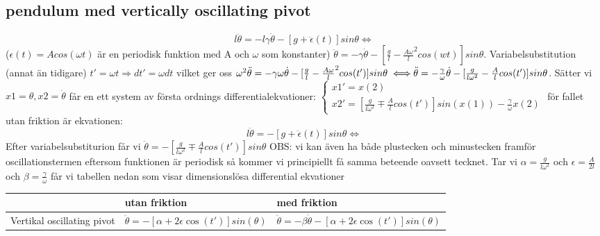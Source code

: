 \documentclass{article}
\begin{document}
\subsection{pendulum med vertically oscillating pivot}
\begin{equation}  
l\ddot{\theta} = -l{\gamma}\dot{\theta}-[g + \ddot{\epsilon}(t)] sin{\theta} \iff
\end{equation} ($ {\epsilon}(t)= Acos({\omega}t) $ är en periodisk funktion med A och ${\omega}$ som konstanter)
$ \ddot{\theta} = -{\gamma}\dot{\theta}-[\frac{g}{l} - \frac{A\omega}{l}^{2} cos(wt)] sin{\theta}$. Variabelsubstitution (annat än tidigare) $t' = {\omega}t \Rightarrow dt' = {\omega}dt$ vilket ger oss $ {\omega}^{2} \ddot{\theta} = -{\gamma}{\omega}\dot{\theta}-[\frac{g}{l} - \frac{A\omega}{l}^{2} cos(t')] sin{\theta} \iff \newline \ddot{\theta} = -\frac{\gamma}{\omega}\dot{\theta}-[\frac{g}{l{\omega}^{2}} - \frac{A}{l} cos(t')] sin{\theta}$. 
Sätter vi $ x1 = {\theta}, x2 = \dot{\theta} $ får en ett system av första ordnings differentialekvationer: \newline
$\begin{cases}
x1'= x(2) \\ 
x2' = [\frac{g}{l{\omega}^{2}} \mp \frac{A}{l} cos(t')] sin(x(1)) -\frac{\gamma}{\omega} x(2) \end{cases}$ \newline
för fallet utan friktion är ekvationen:
\begin{equation}
l\ddot{\theta} = -[g + \ddot{\epsilon}(t)] sin{\theta} \iff
\end{equation} Efter variabelsubstiturion får vi 
$ \ddot{\theta} = -[\frac{g}{l{\omega}^{2}} \mp \frac{A}{l} cos(t')] sin{\theta} $ \newline
OBS: vi kan även ha både plustecken och minustecken framför oscillationstermen eftersom funktionen är periodisk så kommer vi principiellt få samma beteende oavsett tecknet. \newline
Tar vi $ {\alpha} =  \frac{g}{l{\omega}^{2}} $ och $ {\epsilon} = \frac{A}{2l} $ och $ {\beta} = \frac{\gamma}{\omega} $ får vi tabellen nedan som visar dimensionslösa differential ekvationer
\begin{center}
    \begin{tabular}{| l | l | l |}
    \hline
     & utan friktion & med friktion \\ \hline
    Vertikal oscillating pivot & $ \ddot{\theta} = -[{\alpha} + 2{\epsilon}\cos(t')]sin({\theta}) $ & $ \ddot{\theta} = -{\beta}\dot{\theta}-[{\alpha} + 2{\epsilon}\cos(t')]sin({\theta}) $ \\ \hline
    \end{tabular}
\end{center} 
\end{document}
